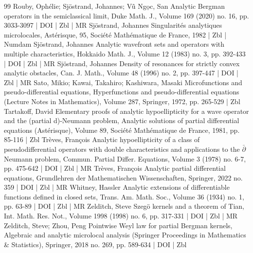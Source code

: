 \begin{thebibliography}{99}
Rouby, Ophélie; Sjöstrand, Johannes; Vũ Ngọc, San Analytic Bergman operators in the semiclassical limit, Duke Math. J., Volume 169 (2020) no. 16, pp. 3033-3097 | DOI | Zbl | MR
Sjöstrand, Johannes Singularités analytiques microlocales, Astérisque, 95, Société Mathématique de France, 1982 | Zbl | Numdam
Sjöstrand, Johannes Analytic wavefront sets and operators with multiple characteristics, Hokkaido Math. J., Volume 12 (1983) no. 3, pp. 392-433 | DOI | Zbl | MR
Sjöstrand, Johannes Density of resonances for strictly convex analytic obstacles, Can. J. Math., Volume 48 (1996) no. 2, pp. 397-447 | DOI | Zbl | MR
Sato, Mikio; Kawai, Takahiro; Kashiwara, Masaki Microfunctions and pseudo-differential equations, Hyperfunctions and pseudo-differential equations (Lecture Notes in Mathematics), Volume 287, Springer, 1972, pp. 265-529 | Zbl
Tartakoff, David Elementary proofs of analytic hypoellipticity for a wave operator and the (partial d)-Neumann problem, Analytic solutions of partial differential equations (Astérisque), Volume 89, Société Mathématique de France, 1981, pp. 85-116 | Zbl
Trèves, François Analytic hypoellipticity of a class of pseudodifferential operators with double characteristics and applications to the $\bar{\partial }$Neumann problem, Commun. Partial Differ. Equations, Volume 3 (1978) no. 6-7, pp. 475-642 | DOI | Zbl | MR
Trèves, François Analytic partial differential equations, Grundlehren der Mathematischen Wissenschaften, Springer, 2022 no. 359 | DOI | Zbl | MR
Whitney, Hassler Analytic extensions of differentiable functions defined in closed sets, Trans. Am. Math. Soc., Volume 36 (1934) no. 1, pp. 63-89 | DOI | Zbl | MR
Zelditch, Steve Szegö kernels and a theorem of Tian, Int. Math. Res. Not., Volume 1998 (1998) no. 6, pp. 317-331 | DOI | Zbl | MR
Zelditch, Steve; Zhou, Peng Pointwise Weyl law for partial Bergman kernels, Algebraic and analytic microlocal analysis (Springer Proceedings in Mathematics \& Statistics), Springer, 2018 no. 269, pp. 589-634 | DOI | Zbl
\end{thebibliography}
